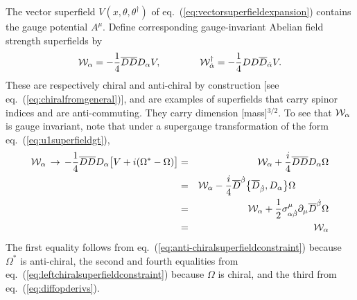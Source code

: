 \documentclass[12pt]{article}
\def\beq{\begin{eqnarray}}
\def\eeq{\end{eqnarray}}
\def\Dcon{\overline D}
\begin{document}
The vector superfield $V(x,\theta,\theta^\dagger)$ of 
eq.~(\ref{eq:vectorsuperfieldexpansion})
contains the gauge potential $A^\mu$. 
Define corresponding gauge-invariant Abelian
field strength superfields by 
\beq
{\cal W}_\alpha = -\frac{1}{4} \Dcon\Dcon D_\alpha V,
\qquad\qquad
{\cal W}^\dagger_{\dot\alpha} = -\frac{1}{4} DD \Dcon_{\dot\alpha} V.
\label{eq:defineWalpha}
\eeq
These
are respectively chiral and anti-chiral by construction 
[see eq.~(\ref{eq:chiralfromgeneral})], and are examples of 
superfields that carry spinor indices and are anti-commuting. They carry 
dimension [mass]$^{3/2}$.
To see that ${\cal W}_\alpha$ is gauge invariant, note that under 
a supergauge transformation of the form eq.~(\ref{eq:u1superfieldgt}),
\beq
{\cal W}_\alpha \,\rightarrow\, 
-\frac{1}{4} \Dcon\Dcon D_\alpha \bigl [V
+ i (\Omega^* - \Omega) \bigr ]
\label{eq:Walphagione}
&=& 
{\cal W}_\alpha + \frac{i}{4} \Dcon\Dcon D_\alpha \Omega
\\
&=&
{\cal W}_\alpha - \frac{i}{4} \Dcon^{\dot\beta}\bigl \lbrace
\Dcon_{\dot\beta}, D_\alpha \bigr \rbrace \Omega \phantom{xxxxxx}
\\
&=&
{\cal W}_\alpha + \frac{1}{2} \sigma^\mu_{\alpha\dot\beta} 
\partial_\mu \Dcon^{\dot\beta}\Omega
\\
&=&
{\cal W}_\alpha
\label{eq:Walphagitwo}
\eeq
The first equality follows from eq.~(\ref{eq:anti-chiralsuperfieldconstraint})
because $\Omega^*$ is anti-chiral, the second and fourth equalities from
eq.~(\ref{eq:leftchiralsuperfieldconstraint}) because $\Omega$ is 
chiral, and the third from eq.~(\ref{eq:diffopderivs}).
\end{document}
